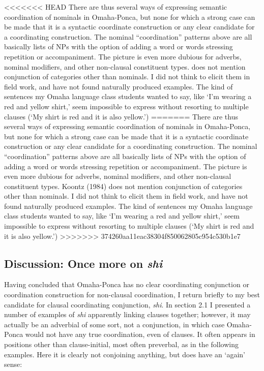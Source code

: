\documentclass[output=paper]{LSP/langsci}
\begin{document}
<<<<<<< HEAD
There are thus several ways of expressing semantic coordination of nominals in Omaha-Ponca, but none for which a strong case can be made that it is a syntactic coordinate construction or any clear candidate for a coordinating construction. The nominal ``coordination'' patterns above are all basically lists of NPs with the option of adding a word or words stressing repetition or accompaniment. The picture is even more dubious for adverbs, nominal modifiers, and other non-clausal constituent types. \citet{Koontz1984} does not mention conjunction of categories other than nominals. I did not think to elicit them in field work, and have not found naturally produced examples.  The kind of sentences my Omaha language class students wanted to say, like `I'm wearing a red and yellow shirt,' seem impossible to express without resorting to multiple clauses (`My shirt is red and it is also yellow.')
=======
There are thus several ways of expressing semantic coordination of nominals in Omaha-Ponca, but none for which a strong case can be made that it is a syntactic coordinate construction or any clear candidate for a coordinating construction. The nominal ``coordination'' patterns above are all basically lists of NPs with the option of adding a word or words stressing repetition or accompaniment. The picture is even more dubious for adverbs, nominal modifiers, and other non-clausal constituent types. Koontz (1984) does not mention conjunction of categories other than nominals. I did not think to elicit them in field work, and have not found naturally produced examples.  The kind of sentences my Omaha language class students wanted to say, like `I'm wearing a red and yellow shirt,' seem impossible to express without resorting to multiple clauses (`My shirt is red and it is also yellow.')
>>>>>>> 374260aa11eac38304f850062805c954c530b1e7

\subsection{Discussion: Once more on \textit{shi}}

Having concluded that Omaha-Ponca has no clear coordinating conjunction or coordination construction for non-clausal coordination, I return briefly to my best candidate for clausal coordinating conjunction, \textit{shi}. In section 2.1 I presented a number of examples of \textit{shi} apparently linking clauses together; however, it may actually be an adverbial of some sort, not a conjunction, in which case Omaha-Ponca would not have any true coordination, even of clauses. It often appears in positions other than clause-initial, most often preverbal, as in the following examples. Here it is clearly not conjoining anything, but does have an `again' sense:  
\end{document}
